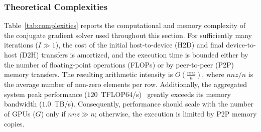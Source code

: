 \documentclass{juliacon}
\begin{document}
\begin{table}[]
\centering
\caption{Compute and memory complexity of the Conjugate Gradient method with XK.BLAS using 1 tile per GPU. $G$ is the number of GPUs, $I$ is the number of iterations the solver performed, $n$ is the number of rows and columns of the matrix, $nnz$ is the total number of non-zero values in the matrix, and $S$ is the size of type in byte (i.e., float is 4, double is 8, etc.).}
\label{tab:complexities}
%
\end{table}

\subsubsection{Theoretical Complexities} \label{sec:complexities}
Table~\ref{tab:complexities} reports the computational and memory complexity of the conjugate gradient solver used throughout this section.
%
For sufficiently many iterations ($I \gg 1$), the cost of the initial host-to-device (H2D) and final device-to-host (D2H) transfers is amortized, and the execution time is bounded either by the number of floating-point operations (FLOPs) or by peer-to-peer (P2P) memory transfers.
The resulting arithmetic intensity is $O(\frac{nnz}{n})$, where $nnz/n$ is the average number of non-zero elements per row.
Additionally, the aggregated system peak performance ($120$~TFLOP64/s)~\cite{h100} greatly exceeds its memory bandwidth ($1.0$~TB/s).
Consequently, performance should scale with the number of GPUs ($G$) only if $nnz \gg n$; otherwise, the execution is limited by P2P memory copies.
\end{document}
